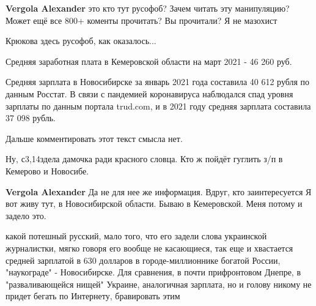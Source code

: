 \begin{itemize}
\begin{itemize}
\textbf{Vergola Alexander} это кто тут русофоб? Зачем читать эту манипуляцию? Может ещё все 800+ коменты прочитать? Вы прочитали? Я не мазохист

 
Крюкова здесь русофоб, как оказалось...
\end{itemize}

 

Средняя заработная плата в Кемеровской области на март 2021 - 46 260 руб.

Средняя зарплата в Новосибирске за январь 2021 года составила 40 612 рубля по
данным Росстат. В связи с пандемией коронавируса наблюдался спад уровня
зарплаты по данным портала trud.com, и в 2021 году средняя зарплата составила
37 098 рубль.

Дальше комментировать этот текст смысла нет.

\begin{itemize}
 
Ну, с3,14здела дамочка ради красного словца. Кто ж пойдёт гуглить з/п в Кемерово и Новосибе.

 
\textbf{Vergola Alexander} Да не для нее же информация. Вдруг, кто заинтересуется \Smiley[1.0][yellow] Я вот живу тут, в Новосибирской области. Бываю в Кемеровской. Меня потому и задело это.

 
какой потешный русский, мало того, что его задели слова украинской журналистки, мягко говоря его вообще не касающиеся, так еще и хвастается средней зарплатой в 630 долларов в городе-миллионнике богатой России, "наукограде" - Новосибирске. Для сравнения, в почти прифронтовом Днепре, в "разваливающейся нищей" Украине, аналогичная зарплата, но и голову никому не придет бегать по Интернету, бравировать этим


\end{itemize}
\end{itemize}
